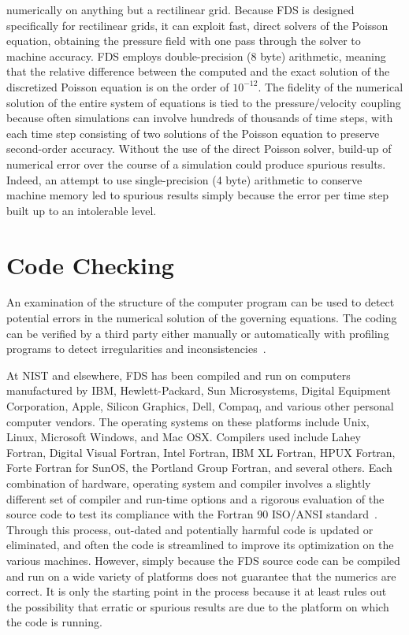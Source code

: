\documentclass[11pt]{book}
\begin{document}
\begin{itemize}
numerically on anything but a rectilinear grid. Because FDS is
designed specifically for rectilinear grids, it can exploit fast,
direct solvers of the Poisson equation, obtaining the pressure field
with one pass through the solver to machine accuracy. FDS employs
double-precision (8 byte) arithmetic, meaning that the relative
difference between the computed and the exact solution of the
discretized Poisson equation is on the order of $10^{-12}$. The
fidelity of the numerical solution of the entire system of equations
is tied to the pressure/velocity coupling because often simulations
can involve hundreds of thousands of time steps, with each time step
consisting of two solutions of the Poisson equation to preserve
second-order accuracy. Without the use of the direct Poisson solver,
build-up of numerical error over the course of a simulation could
produce spurious results. Indeed, an attempt to use single-precision
(4 byte) arithmetic to conserve machine memory led to spurious results
simply because the error per time step built up to an intolerable
level.
\end{itemize}


\section{Code Checking}
\label{Code Checking}

An examination of the structure of the computer program can be used to
detect potential errors in the numerical solution of the governing
equations.  The coding can be verified by a third party either
manually or automatically with profiling programs to detect
irregularities and inconsistencies~\cite{ASTM:E1355}.

At NIST and elsewhere, FDS has been compiled and run on computers
manufactured by IBM, Hewlett-Packard, Sun Microsystems, Digital
Equipment Corporation, Apple, Silicon Graphics, Dell, Compaq, and
various other personal computer vendors. The operating systems on
these platforms include Unix, Linux, Microsoft Windows, and Mac
OSX. Compilers used include Lahey Fortran, Digital Visual Fortran,
Intel Fortran, IBM XL Fortran, HPUX Fortran, Forte Fortran for SunOS,
the Portland Group Fortran, and several others. Each combination of
hardware, operating system and compiler involves a slightly different
set of compiler and run-time options and a rigorous evaluation of the
source code to test its compliance with the Fortran 90 ISO/ANSI
standard~\cite{F90}. Through this process, out-dated and potentially
harmful code is updated or eliminated, and often the code is
streamlined to improve its optimization on the various
machines. However, simply because the FDS source code can be compiled
and run on a wide variety of platforms does not guarantee that the
numerics are correct. It is only the starting point in the process
because it at least rules out the possibility that erratic or spurious
results are due to the platform on which the code is running.
\end{document}
